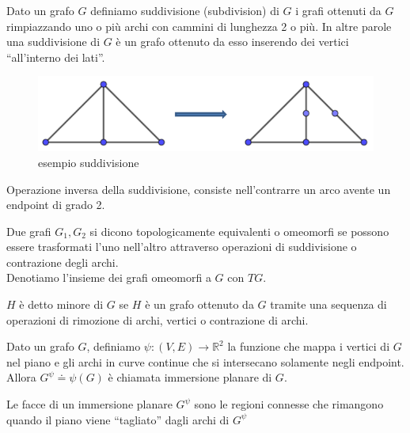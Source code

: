\begin{definizione}[Suddivisione]
    Dato un grafo \(G\) definiamo suddivisione (subdivision) di \(G\) i grafi ottenuti da \(G\) rimpiazzando uno o più archi con cammini di lunghezza 2 o più. In altre parole una suddivisione di \(G\) è un grafo ottenuto da esso inserendo dei vertici “all'interno dei lati”.
\end{definizione}
\begin{figure}[H]
    \centering
    \includegraphics[scale=0.6]{img/suddivisione.PNG}
    \caption{esempio suddivisione}
\end{figure}
\begin{definizione}[Contrazione]
    Operazione inversa della suddivisione, consiste nell'contrarre un arco avente un endpoint di grado 2.
\end{definizione}

\begin{definizione}
    Due grafi \(G_1,G_2\) si dicono topologicamente equivalenti o omeomorfi se possono essere trasformati l'uno nell'altro attraverso operazioni di suddivisione o contrazione degli archi.
    \\ Denotiamo l'insieme dei grafi omeomorfi a \(G\) con \(TG\).
\end{definizione}

\begin{definizione}[Minore]
    \(H\) è detto minore di \(G\) se \(H\) è un grafo ottenuto da \(G\) tramite una sequenza di operazioni di rimozione di archi, vertici o contrazione di archi.
\end{definizione}

\begin{definizione}
    Dato un grafo \(G\), definiamo \(\psi : (V,E) \to \mathbb{R}^2\) la funzione che mappa i vertici di \(G\) nel piano e gli archi in curve continue che si intersecano solamente negli endpoint. Allora \(G^\psi \doteq \psi(G)\) è chiamata immersione planare di \(G\).
\end{definizione}

\begin{definizione}[Facce]
    Le facce di un immersione planare \(G^\psi\) sono le regioni connesse che rimangono quando il piano viene “tagliato” dagli archi di \(G^\psi\)
\end{definizione}

